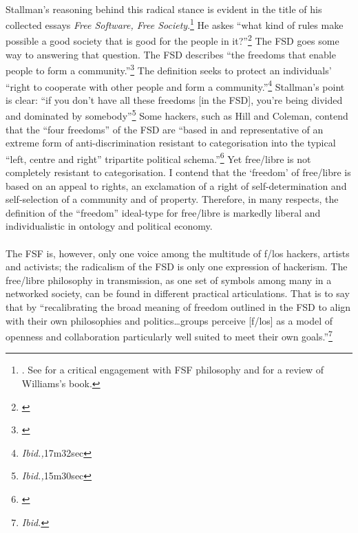 \paragraph{}Stallman's reasoning behind this radical stance is evident in the title of his collected essays \textit{Free Software, Free Society}.\footnote{\cite{Stallman:2002xy}. See \cite{Williams:2007uq} for a critical engagement with FSF philosophy and \cite{Stallabrass:2002kx} for a review of Williams's book.} He askes ``what kind of rules make possible a good society that is good for the people in it?''\footnote{\cite[Ch. 8]{Williams:2007uq}} The FSD goes some way to answering that question. The FSD describes ``the freedoms that enable people to form a community.''\footnote{\cite[15m30sec]{moore:2002rv}} The definition seeks to protect an individuals' ``right to cooperate with other people and form a community.''\footnote{\textit{Ibid.,}17m32sec} Stallman's point is clear: ``if you don't have all these freedoms [in the FSD], you're being divided and dominated by somebody''\footnote{\textit{Ibid.,}15m30sec} Some hackers, such as Hill and Coleman, contend that the ``four freedoms'' of the FSD are ``based in and representative of an extreme form of anti-discrimination resistant to categorisation into the typical ``left, centre and right'' tripartite political schema.''\footnote{\cite{coleman:2004fo}} Yet free/libre is not completely resistant to categorisation. I contend that the `freedom' of free/libre is based on an appeal to rights, an exclamation of a right of self-determination and self-selection of a community and of property. Therefore, in many respects, the definition of the ``freedom'' ideal-type for free/libre is markedly liberal and individualistic in ontology and political economy.

\paragraph{}The FSF is, however, only one voice among the multitude of f/los hackers, artists and activists; the radicalism of the FSD is only one expression of hackerism. The free/libre philosophy in transmission, as one set of symbols among many in a networked society, can be found in different practical articulations. That is to say that by ``recalibrating the broad meaning of freedom outlined in the FSD to align with their own philosophies and politics\ldots groups perceive [f/los] as a model of openness and collaboration particularly well suited to meet their own goals.''\footnote{\textit{Ibid.}} 

